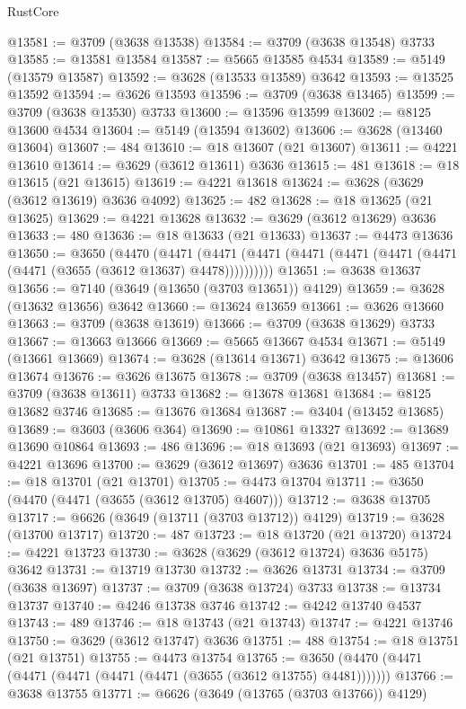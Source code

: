 \begin{lexlean}{RustCore}
\begin{coremodule}
@13581 := @3709 (@3638 @13538)
@13584 := @3709 (@3638 @13548) @3733
@13585 := @13581 @13584
@13587 := @5665 @13585 @4534
@13589 := @5149 (@13579 @13587)
@13592 := @3628 (@13533 @13589) @3642
@13593 := @13525 @13592
@13594 := @3626 @13593
@13596 := @3709 (@3638 @13465)
@13599 := @3709 (@3638 @13530) @3733
@13600 := @13596 @13599
@13602 := @8125 @13600 @4534
@13604 := @5149 (@13594 @13602)
@13606 := @3628 (@13460 @13604)
@13607 := 484
@13610 := @18 @13607 (@21 @13607)
@13611 := @4221 @13610
@13614 := @3629 (@3612 @13611) @3636
@13615 := 481
@13618 := @18 @13615 (@21 @13615)
@13619 := @4221 @13618
@13624 := @3628 (@3629 (@3612 @13619) @3636 @4092)
@13625 := 482
@13628 := @18 @13625 (@21 @13625)
@13629 := @4221 @13628
@13632 := @3629 (@3612 @13629) @3636
@13633 := 480
@13636 := @18 @13633 (@21 @13633)
@13637 := @4473 @13636
@13650 := @3650
    (@4470
      (@4471 (@4471 (@4471 (@4471 (@4471 (@4471 (@4471 (@4471 (@3655 (@3612 @13637) @4478))))))))))
@13651 := @3638 @13637
@13656 := @7140 (@3649 (@13650 (@3703 @13651)) @4129)
@13659 := @3628 (@13632 @13656) @3642
@13660 := @13624 @13659
@13661 := @3626 @13660
@13663 := @3709 (@3638 @13619)
@13666 := @3709 (@3638 @13629) @3733
@13667 := @13663 @13666
@13669 := @5665 @13667 @4534
@13671 := @5149 (@13661 @13669)
@13674 := @3628 (@13614 @13671) @3642
@13675 := @13606 @13674
@13676 := @3626 @13675
@13678 := @3709 (@3638 @13457)
@13681 := @3709 (@3638 @13611) @3733
@13682 := @13678 @13681
@13684 := @8125 @13682 @3746
@13685 := @13676 @13684
@13687 := @3404 (@13452 @13685)
@13689 := @3603 (@3606 @364)
@13690 := @10861 @13327
@13692 := @13689 @13690 @10864
@13693 := 486
@13696 := @18 @13693 (@21 @13693)
@13697 := @4221 @13696
@13700 := @3629 (@3612 @13697) @3636
@13701 := 485
@13704 := @18 @13701 (@21 @13701)
@13705 := @4473 @13704
@13711 := @3650 (@4470 (@4471 (@3655 (@3612 @13705) @4607)))
@13712 := @3638 @13705
@13717 := @6626 (@3649 (@13711 (@3703 @13712)) @4129)
@13719 := @3628 (@13700 @13717)
@13720 := 487
@13723 := @18 @13720 (@21 @13720)
@13724 := @4221 @13723
@13730 := @3628 (@3629 (@3612 @13724) @3636 @5175) @3642
@13731 := @13719 @13730
@13732 := @3626 @13731
@13734 := @3709 (@3638 @13697)
@13737 := @3709 (@3638 @13724) @3733
@13738 := @13734 @13737
@13740 := @4246 @13738 @3746
@13742 := @4242 @13740 @4537
@13743 := 489
@13746 := @18 @13743 (@21 @13743)
@13747 := @4221 @13746
@13750 := @3629 (@3612 @13747) @3636
@13751 := 488
@13754 := @18 @13751 (@21 @13751)
@13755 := @4473 @13754
@13765 := @3650 (@4470 (@4471 (@4471 (@4471 (@4471 (@4471 (@3655 (@3612 @13755) @4481)))))))
@13766 := @3638 @13755
@13771 := @6626 (@3649 (@13765 (@3703 @13766)) @4129)

\end{coremodule}
\end{lexlean}
